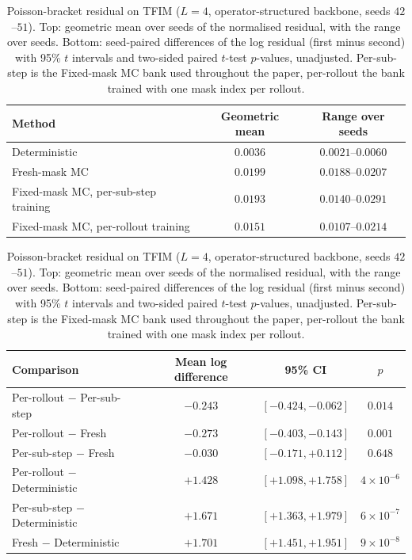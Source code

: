 \begin{table}[t]
\caption{Poisson-bracket residual on TFIM ($L=4$, operator-structured
backbone, seeds $42$--$51$). Top: geometric mean over seeds of the
normalised residual, with the range over seeds. Bottom: seed-paired
differences of the log residual (first minus second) with 95\% $t$
intervals and two-sided paired $t$-test $p$-values, unadjusted.
Per-sub-step is the Fixed-mask MC bank used throughout the paper,
per-rollout the bank trained with one mask index per rollout.}
\label{tab:poisson-bracket}
\centering
\small
\begin{tabular}{lcc}
\toprule
Method & Geometric mean & Range over seeds \\
\midrule
Deterministic & $0.0036$ & $0.0021$--$0.0060$ \\
Fresh-mask MC & $0.0199$ & $0.0188$--$0.0207$ \\
Fixed-mask MC, per-sub-step training & $0.0193$ & $0.0140$--$0.0291$ \\
Fixed-mask MC, per-rollout training & $0.0151$ & $0.0107$--$0.0214$ \\
\bottomrule
\end{tabular}
\par\medskip
\begin{tabular}{lccc}
\toprule
Comparison & Mean log difference & 95\% CI & $p$ \\
\midrule
Per-rollout $-$ Per-sub-step & $-0.243$ & $[-0.424,-0.062]$ & $0.014$ \\
Per-rollout $-$ Fresh & $-0.273$ & $[-0.403,-0.143]$ & $0.001$ \\
Per-sub-step $-$ Fresh & $-0.030$ & $[-0.171,+0.112]$ & $0.648$ \\
Per-rollout $-$ Deterministic & $+1.428$ & $[+1.098,+1.758]$ & $4\times10^{-6}$ \\
Per-sub-step $-$ Deterministic & $+1.671$ & $[+1.363,+1.979]$ & $6\times10^{-7}$ \\
Fresh $-$ Deterministic & $+1.701$ & $[+1.451,+1.951]$ & $9\times10^{-8}$ \\
\bottomrule
\end{tabular}
\end{table}
